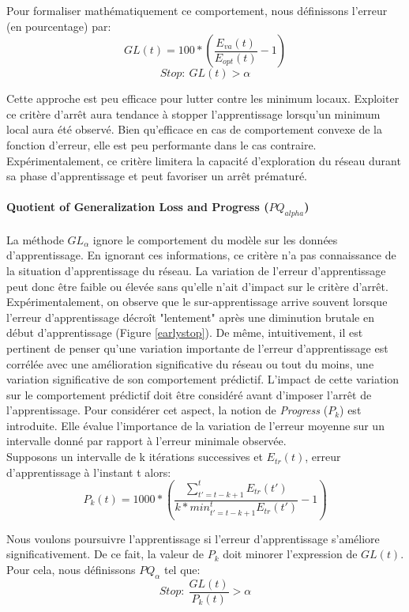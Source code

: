 \noindent Pour formaliser mathématiquement ce comportement, nous définissons l'erreur (en pourcentage) par:
$$GL(t)=100*(\frac{E_{va}(t)}{E_{opt}(t)}-1)$$
$$Stop: \ GL(t) > \alpha$$

\noindent Cette approche est peu efficace pour lutter contre les minimum locaux. Exploiter ce critère d'arrêt aura tendance à stopper l'apprentissage lorsqu'un minimum local aura été observé. Bien qu'efficace en cas de comportement convexe de la fonction d'erreur, elle est peu performante dans le cas contraire. Expérimentalement, ce critère limitera la capacité d'exploration du réseau durant sa phase d'apprentissage et peut favoriser un arrêt prématuré.

\paragraph{Quotient of Generalization Loss and Progress ($PQ_{alpha}$)}
La méthode $GL_{\alpha}$ ignore le comportement du modèle sur les données d'apprentissage. En ignorant ces informations, ce critère n'a pas connaissance de la situation d'apprentissage du réseau. La variation de l'erreur d'apprentissage peut donc être faible ou élevée sans qu'elle n'ait d'impact sur le critère d'arrêt. Expérimentalement, on observe que le sur-apprentissage arrive souvent lorsque l'erreur d'apprentissage décroît "lentement" après une diminution brutale en début d'apprentissage (Figure \ref{earlystop}). De même, intuitivement, il est pertinent de penser qu'une variation importante de l'erreur d'apprentissage est corrélée avec une amélioration significative du réseau ou tout du moins, une variation significative de son comportement prédictif. L'impact de cette variation sur le comportement prédictif doit être considéré avant d'imposer l'arrêt de l'apprentissage. Pour considérer cet aspect, la notion de \textit{Progress} ($P_k$)\cite{earlystop} est introduite. Elle évalue l'importance de la variation de l'erreur moyenne sur un intervalle donné par rapport à l'erreur minimale observée.\\

\noindent Supposons un intervalle de k itérations successives et $E_{tr}(t)$, erreur d'apprentissage à l'instant t alors:
$$P_k(t)=1000*(\frac{\sum_{t'=t-k+1}^tE_{tr}(t')}{k*min_{t'=t-k+1}^tE_{tr}(t')}-1)$$

\noindent Nous voulons poursuivre l'apprentissage si l'erreur d'apprentissage s'améliore significativement. De ce fait, la valeur de $P_k$ doit minorer l'expression de $GL(t)$. Pour cela, nous définissons $PQ_{\alpha}$\cite{earlystop} tel que:
$$Stop: \ \frac{GL(t)}{P_k(t)} > \alpha$$

